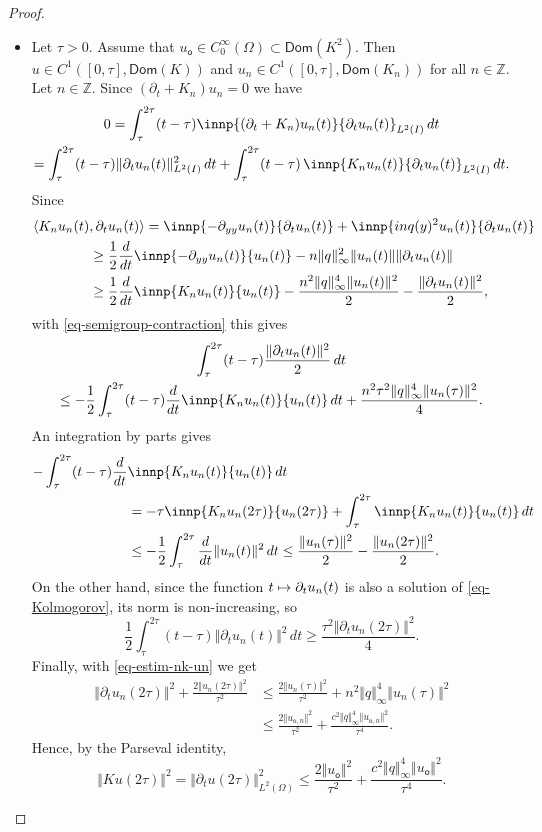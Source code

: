 \documentclass[JEP,XML,SOM,Unicode]{cedram}
\def\mto{\mathchoice{\longmapsto}{\mapsto}{\mapsto}{\mapsto}}
\theoremstyle{plain}
\theoremstyle{definition}
\newcommand{\nr}[1]{\Vert #1\Vert}
\newcommand{\1}{\mathds 1}
\let\Re\relax
\DeclareMathOperator{\Re}{\mathsf{Re}\mkern2mu}
\newcommand{\Dom}{\mathsf{Dom}}
\newcommand{\Z}{\mathbb{Z}}
\let\O\Omega
\newcommand{\uo}{u_{\mathsf{o}}}
\newcommand{\uon}{u_{\mathsf{o},n}}
\begin{document}
\begin{proof}
\begin{itemize}
\item
Let $\tau > 0$. Assume that $\uo \in C_0^\infty(\O) \subset \Dom(K^2)$. Then $u \in C^1([0,\tau], \Dom(K))$ and $u_n \in C^1([0,\tau], \Dom(K_n))$ for all $n \in \Z$. Let $n \in \Z$. Since $(\partial_t + K_n) u_n = 0$ we have
\begin{multline*}
0 = \Re \int_\tau^{2\tau} (t-\tau) \innp{(\partial_t + K_n) u_n(t)}{\partial_t u_n(t)}_{L^2(I)} \, dt\\
= \int_\tau^{2\tau} (t-\tau) \nr{\partial_t u_n(t)}_{L^2(I)}^2 \, dt + \int_\tau^{2\tau} (t-\tau) \, \Re \innp{K_n u_n(t)}{\partial_t u_n(t)}_{L^2(I)} \, dt.
\end{multline*}
Since
\begin{align*}
\Re \langle K_n u_n(t)&,\partial_t u_n(t)\rangle = \Re \innp{-\partial_{yy} u_n(t)}{\partial_t u_n(t)} + \Re \innp{inq(y)^2 u_n(t)}{\partial_t u_n(t)}\\
& \geq \frac 12 \frac d {dt} \innp{-\partial_{yy} u_n(t)}{u_n(t)} - n \nr{q}_\infty^2 \nr{u_n(t)} \nr{\partial_t u_n(t)}\\
& \geq \frac 12 \frac d {dt} \Re \innp{K_n u_n(t)}{u_n(t)} - \frac {n^2 \nr{q}_\infty^4 \nr{u_n(t)}^2}2 - \frac {\nr{\partial_t u_n(t)}^2} 2,
\end{align*}
with \eqref{eq-semigroup-contraction} this gives
\begin{multline*}
\int_{\tau}^{2\tau} (t-\tau) \frac {\nr{\partial_t u_n(t)}^2} 2 \, dt\\
\leq - \frac 12 \Re \int_{\tau}^{2\tau} (t-\tau) \frac d {dt} \innp{K_n u_n(t)}{u_n(t)} \, dt + \frac {n^2 \tau^2 \nr{q}_\infty^4 \nr{u_n(\tau)}^2} 4.
\end{multline*}
An integration by parts gives
\begin{align*}
- \Re \int_\tau^{2\tau} (t-\tau) \frac d {dt}& \innp{K_n u_n(t)}{u_n(t)} \, dt\\
& = - \tau \Re \innp{K_n u_n(2\tau)}{u_n(2\tau)} + \int_\tau^{2\tau} \Re \innp{K_n u_n(t)}{u_n(t)} \, dt\\
& \leq - \frac 12 \int_\tau^{2\tau} \frac d {dt} \nr{u_n(t)}^2 \,dt \leq \frac {\nr{u_n(\tau)}^2} 2 - \frac {\nr{u_n(2\tau)}^2} 2.
\end{align*}
On the other hand, since the function $t \mto \partial_t u_n(t)$ is also a solution of \eqref{eq-Kolmogorov}, its norm is non-increasing, so
\[
\frac 12 \int_\tau^{2\tau} (t-\tau) \nr{\partial_t u_n(t)}^2 \, dt \geq \frac {\tau^2 \nr{\partial_t u_n(2 \tau)}^2} 4.
\]
Finally, with \eqref{eq-estim-nk-un} we get
\begin{align*}
\nr{\partial_t u_n(2 \tau)}^2 + \frac {2 \nr{u_n(2\tau)}^2}{\tau^2}
& \leq \frac {2 \nr{u_n(\tau)}^2}{\tau^2} + n^2 \nr{q}_\infty^4 \nr{u_n(\tau)}^2 \\
& \leq \frac {2 \nr{\uon}^2}{\tau^2} + \frac {c^2 \nr{q}_\infty^4 \nr{\uon}^2}{\tau^4}.
\end{align*}
Hence, by the Parseval identity,
\begin{equation} \label{eq-Ku-tau}
\nr{Ku(2\tau)}^2 = \nr{\partial_t u(2\tau)}_{L^2(\O)}^2 \leq \frac {2 \nr{\uo}^2}{\tau^2} + \frac {c^2 \nr{q}_\infty^4 \nr{\uo}^2}{\tau^4}.
\end{equation}


\end{itemize}
\end{proof}
\end{document}
